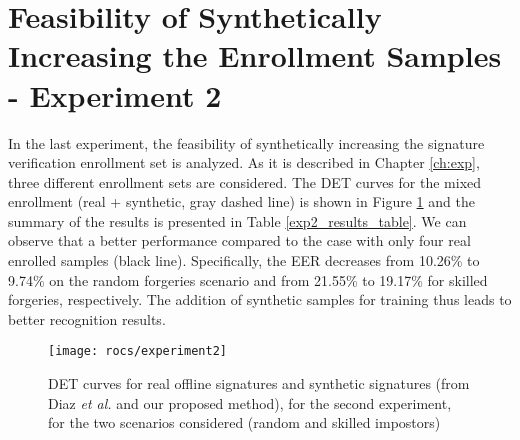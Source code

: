 \section{Feasibility of Synthetically Increasing the Enrollment Samples - Experiment 2}
In the last experiment, the feasibility of synthetically
increasing the signature verification enrollment set is analyzed. As it is described in
Chapter \ref{ch:exp}, three different enrollment sets are considered. The DET curves for the mixed enrollment (real + synthetic, gray dashed line) is shown in Figure \ref{fig:exp2} and the summary of the results is presented in Table \ref{exp2_results_table}. We can observe that a better performance compared to the case with only four real
enrolled samples (black line). Specifically, the EER decreases from 10.26\% to 9.74\% on the random forgeries scenario and from 21.55\% to 19.17\% for skilled forgeries, respectively. The addition of synthetic samples for training thus leads to better recognition results.
\begin{figure}[!htb]
    \centering
    

    \texttt{[image: rocs/experiment2]}
    \caption{DET curves for real offline signatures and synthetic signatures (from Diaz \textit{et al.} and our proposed method), for the second experiment, for the two scenarios considered (random and skilled impostors)}
    \label{fig:exp2}
\end{figure}

